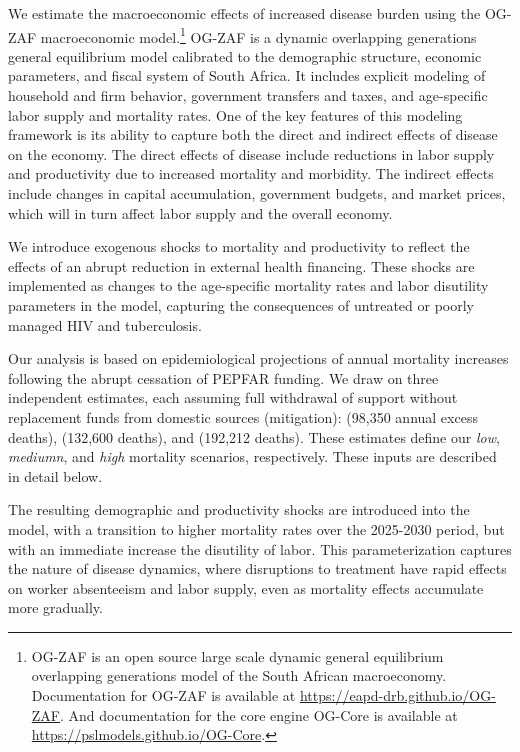 \documentclass[letterpaper,12pt]{article}
\theoremstyle{definition}
\begin{document}
\begin{spacing}{1.5}
We estimate the macroeconomic effects of increased disease burden using the OG-ZAF macroeconomic model.\footnote{OG-ZAF is an open source large scale dynamic general equilibrium overlapping generations model of the South African macroeconomy. Documentation for OG-ZAF is available at \href{https://eapd-drb.github.io/OG-ZAF}{https://eapd-drb.github.io/OG-ZAF}. And documentation for the core engine OG-Core is available at \href{https://pslmodels.github.io/OG-Core}{https://pslmodels.github.io/OG-Core}.} OG-ZAF is a dynamic overlapping generations general equilibrium model calibrated to the demographic structure, economic parameters, and fiscal system of South Africa. It includes explicit modeling of household and firm behavior, government transfers and taxes, and age-specific labor supply and mortality rates. One of the key features of this modeling framework is its ability to capture both the direct and indirect effects of disease on the economy. The direct effects of disease include reductions in labor supply and productivity due to increased mortality and morbidity. The indirect effects include changes in capital accumulation, government budgets, and market prices, which will in turn affect labor supply and the overall economy.

We introduce exogenous shocks to mortality and productivity to reflect the effects of an abrupt reduction in external health financing. These shocks are implemented as changes to the age-specific mortality rates and labor disutility parameters in the model, capturing the consequences of untreated or poorly managed HIV and tuberculosis.

Our analysis is based on epidemiological projections of annual mortality increases following the abrupt cessation of PEPFAR funding. We draw on three independent estimates, each assuming full withdrawal of support without replacement funds from domestic sources (mitigation): \citet{Brink2025} (98,350 annual excess deaths), \citet{Gandhi2025} (132,600 deaths), and \citet{KS2025} (192,212 deaths). These estimates define our \textit{low}, \textit{mediumn}, and \textit{high} mortality scenarios, respectively. These inputs are described in detail below.

The resulting demographic and productivity shocks are introduced into the model, with a transition to higher mortality rates over the 2025-2030 period, but with an immediate increase the disutility of labor. This parameterization captures the nature of disease dynamics, where disruptions to treatment have rapid effects on worker absenteeism and labor supply, even as mortality effects accumulate more gradually.



\end{spacing}
\end{document}
